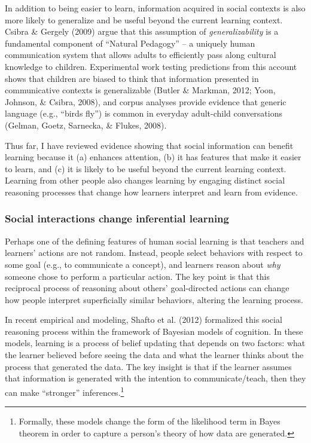 \documentclass[a4paper,man,apacite,floatsintext]{apa6}
\begin{document}
In addition to being easier to learn, information acquired in social
contexts is also more likely to generalize and be useful beyond the
current learning context. Csibra \& Gergely (2009) argue that this
assumption of \emph{generalizability} is a fundamental component of
``Natural Pedagogy'' -- a uniquely human communication system that
allows adults to efficiently pass along cultural knowledge to children.
Experimental work testing predictions from this account shows that
children are biased to think that information presented in communicative
contexts is generalizable (Butler \& Markman, 2012; Yoon, Johnson, \&
Csibra, 2008), and corpus analyses provide evidence that generic
language (e.g., ``birds fly'') is common in everyday adult-child
conversations (Gelman, Goetz, Sarnecka, \& Flukes, 2008).

Thus far, I have reviewed evidence showing that social information can
benefit learning because it (a) enhances attention, (b) it has features
that make it easier to learn, and (c) it is likely to be useful beyond
the current learning context. Learning from other people also changes
learning by engaging distinct social reasoning processes that change how
learners interpret and learn from evidence.

\subsubsection{Social interactions change inferential
learning}\label{social-interactions-change-inferential-learning}

Perhaps one of the defining features of human social learning is that
teachers and learners' actions are not random. Instead, people select
behaviors with respect to some goal (e.g., to communicate a concept),
and learners reason about \emph{why} someone chose to perform a
particular action. The key point is that this reciprocal process of
reasoning about others' goal-directed actions can change how people
interpret superficially similar behaviors, altering the learning
process.

In recent empirical and modeling, Shafto et al. (2012) formalized this
social reasoning process within the framework of Bayesian models of
cognition. In these models, learning is a process of belief updating
that depends on two factors: what the learner believed before seeing the
data and what the learner thinks about the process that generated the
data. The key insight is that if the learner assumes that information is
generated with the intention to communicate/teach, then they can make
``stronger'' inferences.\footnote{Formally, these models change the form
  of the likelihood term in Bayes theorem in order to capture a person's
  theory of how data are generated.}
\end{document}
